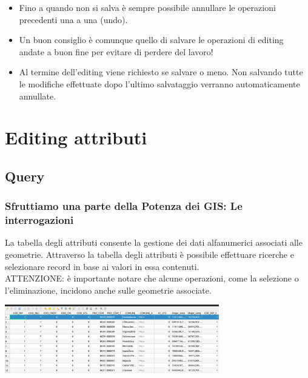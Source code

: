 \documentclass{beamer}
\begin{document}
{\begin{frame}
    \begin{itemize}
	    \item Fino a quando non si salva è sempre possibile annullare le operazioni precedenti una a una (undo).
	    \item Un buon consiglio è comunque quello di salvare le operazioni di editing andate a buon fine per evitare di perdere del lavoro!
	    \item Al termine dell'editing viene richiesto se salvare o meno. Non salvando tutte le modifiche effettuate dopo l'ultimo salvataggio verranno automaticamente annullate. 
    \end{itemize}
\end{frame}

\section{Editing attributi}

\subsection{Query}

\begin{frame}
   \frametitle{Sfruttiamo una parte della Potenza dei GIS: Le interrogazioni}
   La tabella degli attributi consente la gestione dei dati alfanumerici associati alle geometrie. Attraverso la tabella degli attributi è possibile effettuare ricerche e selezionare record in base ai valori in essa contenuti.\\ATTENZIONE: è importante notare che alcune operazioni, come la selezione o l'eliminazione, incidono anche sulle geometrie associate. 
		    \begin{center}
			\includegraphics[width=0.70\textwidth] {corso2023/liguria1.png}
		    \end{center}
\end{frame}

}
\end{document}
